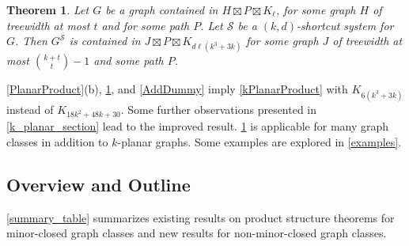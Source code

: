 \documentclass{patmorin}
\theoremstyle{plain}
\newtheorem{thm}{Theorem}
\theoremstyle{definition}
\renewcommand{\SS}{\mathcal{S}}
\begin{document}
\begin{thm}
\label{ShortcutProduct}
Let $G$ be a graph contained in $H\boxtimes P \boxtimes K_\ell$, for some graph $H$ of treewidth at most $t$ and for some path $P$. Let $\SS$ be a $(k,d)$-shortcut system for $G$. Then $G^\SS$ is contained in $J\boxtimes P\boxtimes K_{d\ell(k^3+3k)}$ for some graph $J$ of treewidth at most $\binom{k+t}{t}-1$ and some path $P$.
\end{thm}

\cref{PlanarProduct}(b), \cref{ShortcutProduct}, and \cref{AddDummy} imply \cref{kPlanarProduct} with $K_{6(k^3+3k)}$ instead of $K_{18k^2+48k+30}$. Some further observations presented in \cref{k_planar_section} lead to the improved result.  \cref{ShortcutProduct} is applicable for many graph classes in addition to $k$-planar graphs. Some examples are explored in \cref{examples}.



\subsection{Overview and Outline}

\cref{summary_table} summarizes existing results on product structure theorems for minor-closed graph classes and new results for non-minor-closed graph classes.
\end{document}
